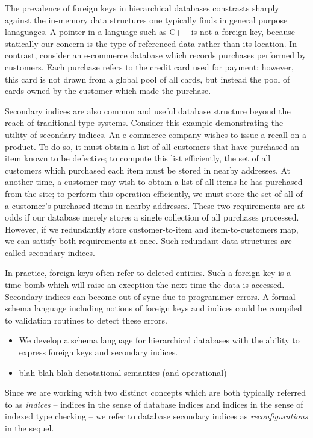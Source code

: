 \documentclass[sigplan,10pt,review,anonymous]{acmart}
\begin{document}
The prevalence of foreign keys in hierarchical databases constrasts sharply against the in-memory data structures one typically finds in general purpose lanaguages. A pointer in a language such as C++ is not a foreign key, because statically our concern is the type of referenced data rather than its location. In contrast, consider an e-commerce database which records purchases performed by customers. Each purchase refers to the credit card used for payment; however, this card is not drawn from a global pool of all cards, but instead the pool of cards owned by the customer which made the purchase. 

Secondary indices are also common and useful database structure beyond the reach of traditional type systems. Consider this example demonstrating the utility of secondary indices. An e-commerce company wishes to issue a recall on a product. To do so, it must obtain a list of all customers that have purchased an item known to be defective; to compute this list efficiently, the set of all customers which purchased each item must be stored in nearby addresses. At another time, a customer may wish to obtain a list of all items he has purchased from the site; to perform this operation efficiently, we must store the set of all of a customer's purchased items in nearby addresses. These two requirements are at odds if our database merely stores a single collection of all purchases processed. However, if we redundantly store customer-to-item and item-to-customers map, we can satisfy both requirements at once. Such redundant data structures are called secondary indices.

In practice, foreign keys often refer to deleted entities. Such a foreign key is a time-bomb which will raise an exception the next time the data is accessed. Secondary indices can become out-of-sync due to programmer errors. A formal schema language including notions of foreign keys and indices could be compiled to validation routines to detect these errors. 

\begin{itemize}   
\item We develop a schema language for hierarchical databases with the ability to express foreign keys and secondary indices. 
\item blah blah blah denotational semantics (and operational)
\end{itemize}

Since we are working with two distinct concepts which are both typically referred to as \emph{indices} -- indices in the sense of database indices and indices in the sense of indexed type checking -- we refer to database secondary indices as \emph{reconfigurations} in the sequel.
\end{document}
